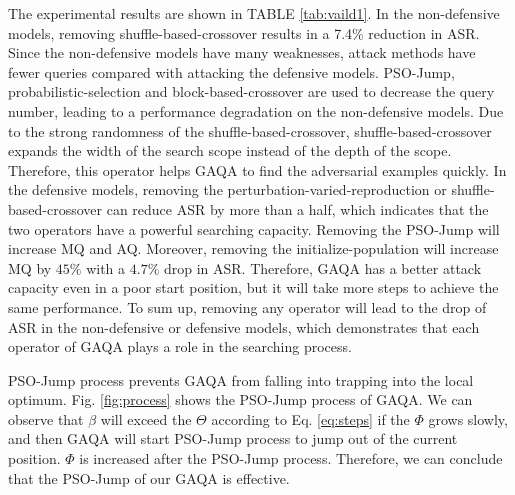 \documentclass[lettersize,journal]{IEEEtran}
\begin{document}
	The experimental results are shown in TABLE \ref{tab:vaild1}. In the non-defensive models, removing shuffle-based-crossover results in a 7.4\% reduction in ASR. Since the non-defensive models have many weaknesses, attack methods have fewer queries compared with attacking the defensive models. PSO-Jump, probabilistic-selection and block-based-crossover are used to decrease the query number, leading to a performance degradation on the non-defensive models. Due to the strong randomness of the shuffle-based-crossover, shuffle-based-crossover expands the width of the search scope instead of the depth of the scope. Therefore, this operator helps GAQA to find the adversarial examples quickly.
	In the defensive models, removing the perturbation-varied-reproduction or shuffle-based-crossover can reduce ASR by more than a half, which indicates that the two operators have a powerful searching capacity. Removing the PSO-Jump will increase MQ and AQ. Moreover, removing the initialize-population will increase MQ by $45\%$ with a $4.7\%$ drop in ASR. Therefore, GAQA has a better attack capacity even in a poor start position, but it will take more steps to achieve the same performance.  
	To sum up, removing any operator will lead to the drop of ASR in the non-defensive or defensive models, which demonstrates that each operator of GAQA plays a role in the searching process. 
	
	
	
	PSO-Jump process prevents GAQA from falling into trapping into the local optimum. Fig. \ref{fig:process} shows the PSO-Jump process of GAQA. We can observe that $\beta$ will exceed the $\Theta$ according to Eq. \ref{eq:steps} if the $\Phi$ grows slowly, and then GAQA will start PSO-Jump process to jump out of the current position. $\Phi$ is increased after the PSO-Jump process. Therefore, we can conclude that the PSO-Jump of our GAQA is effective.
	
	
	
	
\end{document}
